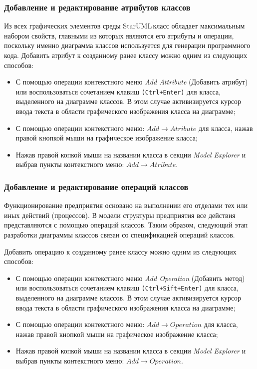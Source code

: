 \documentclass[a4paper,12pt]{extreport}
\newcommand{\staruml}{StarUML\,\tm}
\begin{document}
 
 
\subsubsection*{Добавление и редактирование атрибутов классов}
Из всех графических элементов среды \staruml класс обладает максимальным набором свойств, главными из которых являются его атрибуты и операции, поскольку именно диаграмма классов используется для генерации программного кода.
Добавить атрибут к созданному ранее классу можно одним из следующих способов:
\begin{itemize}
	\item С помощью операции контекстного меню \textit{Add Attribute} (Добавить атрибут) или воспользоваться сочетанием клавиш \texttt{(Ctrl+Enter)} для класса, выделенного на диаграмме классов. В этом случае активизируется курсор ввода текста в области графического изображения класса на диаграмме;
	\item С помощью операции контекстного меню: $Add \to Atribute$ для класса, нажав правой кнопкой мыши на графическое изображение класса;
	\item Нажав правой копкой мыши на названии класса в секции \textit{Model Explorer} и выбрав пункты контекстного меню: $Add \to Atribute$.
\end{itemize}


\subsubsection*{Добавление и редактирование операций классов}
Функционирование предприятия основано на выполнении его отделами тех или иных действий (процессов). В модели структуры предприятия все действия представляются с помощью операций классов. Таким образом, следующий этап разработки диаграммы классов связан со спецификацией операций классов.

Добавить операцию к созданному ранее классу можно одним из следующих способов:
\begin{itemize}
	\item С помощью операции контекстного меню \textit{Add Operation} (Добавить метод) или воспользоваться сочетанием клавиш \texttt{(Ctrl+Sift+Enter)} для класса, выделенного на диаграмме классов. В этом случае активизируется курсор ввода текста в области графического изображения класса на диаграмме;
	\item С помощью операции контекстного меню: $Add \to Operation$ для класса, нажав правой кнопкой мыши на графическое изображение класса;
	\item Нажав правой копкой мыши на названии класса в секции \textit{Model Explorer} и выбрав пункты контекстного меню: $Add \to Operation$.
\end{itemize}
\end{document}
